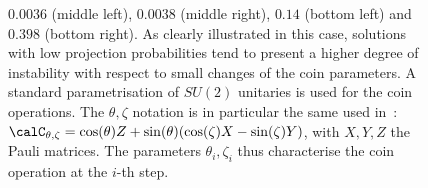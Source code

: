\begin{figure}[tbp]
{        $0.0036$ (middle left), $0.0038$ (middle right),
        $0.14$ (bottom left) and $0.398$ (bottom right).
        As clearly illustrated in this case, solutions with low projection probabilities tend to present a higher degree of instability with respect to small changes of the coin parameters.
        A standard parametrisation of $SU(2)$ unitaries is used for the coin operations. The $\theta,\zeta$ notation is in particular the same used in~\cite{chandrashekar2008optimizing}:
        $\calC_{\theta,\zeta} = \cos(\theta) Z + \sin(\theta)(\cos(\zeta) X - \sin(\zeta) Y)$, with $X,Y,Z$ the Pauli matrices.
        The parameters $\theta_i,\zeta_i$ thus characterise the coin operation at the $i$-th step.
    }
    \label{fig:stabilities_5steps}
\end{figure}


